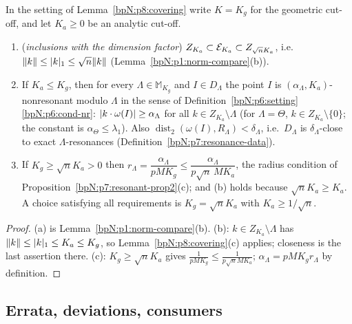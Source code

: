 \begin{corollary}\label{bpN:p8:cutoffs}
In the setting of Lemma~\ref{bpN:p8:covering} write $K=K_g$ for the geometric cut-off, and let $K_a\ge0$ be an analytic cut-off.
\begin{enumerate}[label=(\alph*)]
\item (\emph{inclusions with the dimension factor}) $Z_{K_a}\subset\mathcal E_{K_a}\subset Z_{\sqrt nK_a}$, i.e.\ $\lVert k\rVert\le\lvert k\rvert_1\le\sqrt n\lVert k\rVert$ (Lemma~\ref{bpN:p1:norm-compare}(b)).
\item If $K_a\le K_g$, then for every $\Lambda\in\mathbb M_{K_g}$ and $I\in D_\Lambda$ the point $I$ is $(\alpha_\Lambda,K_a)$-nonresonant modulo $\Lambda$ in the sense of Definition~\ref{bpN:p6:setting}\ref{bpN:p6:cond-nr}: $\lvert k\cdot\omega(I)\rvert\ge\alpha_\Lambda$ for all $k\in Z_{K_a}\setminus\Lambda$ (for $\Lambda=\Theta$, $k\in Z_{K_a}\setminus\{0\}$; the constant is $\alpha_\Theta\le\lambda_1$). Also $\operatorname{dist}_2(\omega(I),R_\Lambda)<\delta_\Lambda$, i.e.\ $D_\Lambda$ is $\delta_\Lambda$-close to exact $\Lambda$-resonances (Definition~\ref{bpN:p7:resonance-data}).
\item If $K_g\ge\sqrt nK_a>0$ then $r_\Lambda=\dfrac{\alpha_\Lambda}{pMK_g}\le\dfrac{\alpha_\Lambda}{p\sqrt n\,MK_a}$, the radius condition of Proposition~\ref{bpN:p7:resonant-prop2}(c); and (b) holds because $\sqrt nK_a\ge K_a$. A choice satisfying all requirements is $K_g=\sqrt nK_a$ with $K_a\ge1/\sqrt n$.
\end{enumerate}
\end{corollary}
\begin{proof}
\label{stepN:p8:co-incl} (a) is Lemma~\ref{bpN:p1:norm-compare}(b). (b): $k\in Z_{K_a}\setminus\Lambda$ has $\lVert k\rVert\le\lvert k\rvert_1\le K_a\le K_g$, so Lemma~\ref{bpN:p8:covering}(c) applies; closeness is the last assertion there. (c): $K_g\ge\sqrt nK_a$ gives $\frac1{pMK_g}\le\frac1{p\sqrt nMK_a}$; $\alpha_\Lambda=pMK_gr_\Lambda$ by definition.
\end{proof}

\subsection{Errata, deviations, consumers}\label{bpN:p8:s-errata}

